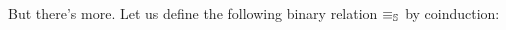 But there's more. Let us define the following binary relation $\equiv_{\mathbb{S}}$
by coinduction:
\[
\]

%
%
